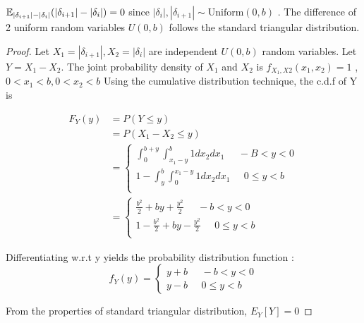 \begin{lemma}
	$\operatorname{\mathbb{E}}_{|\delta_{i+1}|-|\delta_{i}|} (|\delta_{i+1}| -  |\delta_i|) = 0$ since $|\delta_i| , |\delta_{i+1}| \sim \text{Uniform}(0,b)$ . The difference of 2 uniform random variables $U(0,b)$ follows the standard triangular distribution. 
	\label{lemma:diff_uniform_var}
\end{lemma}
\begin{proof}
	Let $X_1=|\delta_{i+1}| , X_2=|\delta_{i}|$ are independent $U(0,b)$ random variables. Let $Y = X_1-X_2 $.
	The joint probability density of $X_1$ and $X_2$ is
	$f_{X_1,X2}(x_1,x_2)=1$ , $ 0<x_1<b, 0<x_2<b$
	Using the cumulative distribution technique, the c.d.f of Y is
	
	\begin{equation}
		\begin{split}
			F_Y(y) & = P(Y \leq y) \\
			& = P(X_1-X_2 \leq y )\\
			&= \begin{cases}
				\int_0^{b+y} \int_{x_1-y}^b 1 dx_2 dx_1  \; \; \; \; \; -B< y < 0 \\
				1 - \int_y^{b} \int^{x_1-y}_0 1 dx_2 dx_1  \; \; \; \; \; 0 \leq y < b \\
			\end{cases}\\
			&= \begin{cases}
				\frac{b^2}{2} + by + \frac{y^2}{2} \; \; \; \; \; -b< y < 0 \\
				1-\frac{b^2}{2} + by - \frac{y^2}{2}\; \; \; \; \; 0 \leq y < b \\
			\end{cases}
		\end{split}
	\end{equation}
	
	Differentiating w.r.t y yields the probability distribution function :
	\begin{equation}
		f_Y(y) =
		\begin{cases}
			y+b \; \; \; \; \; -b< y < 0 \\
			y-b \; \; \; \; \;  0 \leq y < b
		\end{cases}
	\end{equation}
	
	From the properties of standard triangular distribution, $E_Y[Y] = 0 $
	
\end{proof}

